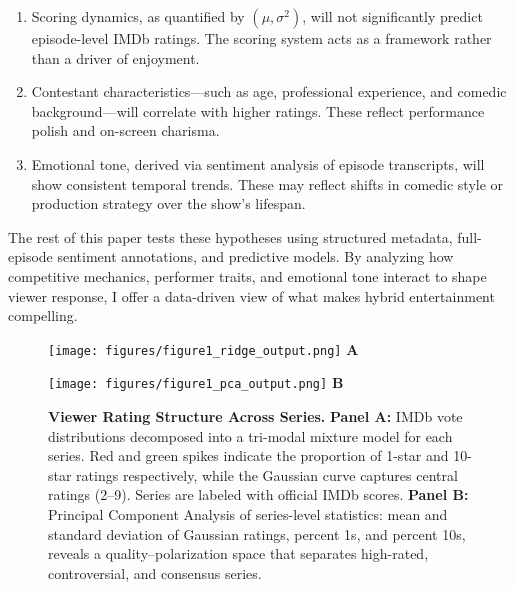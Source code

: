 \documentclass[10pt,letterpaper]{article}
\begin{document}
\begin{enumerate}
  \item Scoring dynamics, as quantified by $(\mu, \sigma^2)$, will not significantly predict episode-level IMDb ratings. The scoring system acts as a framework rather than a driver of enjoyment.
  \item Contestant characteristics—such as age, professional experience, and comedic background—will correlate with higher ratings. These reflect performance polish and on-screen charisma.
  \item Emotional tone, derived via sentiment analysis of episode transcripts, will show consistent temporal trends. These may reflect shifts in comedic style or production strategy over the show's lifespan.
\end{enumerate}

The rest of this paper tests these hypotheses using structured metadata, full-episode sentiment annotations, and predictive models. By analyzing how competitive mechanics, performer traits, and emotional tone interact to shape viewer response, I offer a data-driven view of what makes hybrid entertainment compelling.

\begin{figure}[!h]
\centering
\begin{minipage}{0.48\linewidth}
  \centering
  \texttt{[image: figures/figure1\_ridge\_output.png]}
  \vspace{1mm}
  \textbf{A}
\end{minipage}
\hfill
\begin{minipage}{0.48\linewidth}
  \centering
  \texttt{[image: figures/figure1\_pca\_output.png]}
  \vspace{1mm}
  \textbf{B}
\end{minipage}
\caption{{\bf Viewer Rating Structure Across Series.}
\textbf{Panel A:} IMDb vote distributions decomposed into a tri-modal mixture model for each series. Red and green spikes indicate the proportion of 1-star and 10-star ratings respectively, while the Gaussian curve captures central ratings (2–9). Series are labeled with official IMDb scores. 
\textbf{Panel B:} Principal Component Analysis of series-level statistics: mean and standard deviation of Gaussian ratings, percent 1s, and percent 10s, reveals a quality–polarization space that separates high-rated, controversial, and consensus series.}
\label{fig:series_ratings}
\end{figure}

\end{document}
